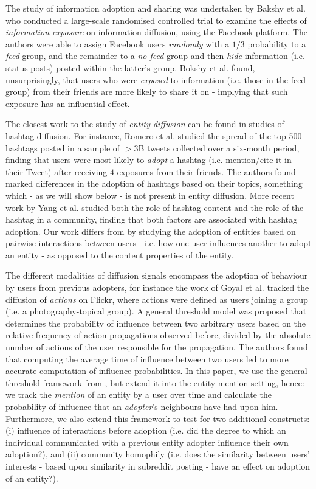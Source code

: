 \documentclass[review]{elsarticle}
\begin{document}
The study of information adoption and sharing was undertaken by Bakshy et al. \cite{bakshy2012role} who conducted a large-scale randomised controlled trial to examine the effects of \emph{information exposure} on information diffusion, using the Facebook platform.
The authors were able to assign Facebook users \emph{randomly} with a $1/3$ probability to a \emph{feed} group, and the remainder to a \emph{no feed} group and then \emph{hide} information (i.e. status posts) posted within the latter's group.
Bokshy et al. found, unsurprisingly, that users who were \emph{exposed} to information (i.e. those in the feed group) from their friends are more likely to share it on - implying that such exposure has an influential effect.

The closest work to the study of \emph{entity diffusion} can be found in studies of hashtag diffusion.
For instance, Romero et al. \cite{romero2011differences} studied the spread of the top-500 hashtags posted in a sample of $>3$B tweets collected over a six-month period, finding that users were most likely to \emph{adopt} a hashtag (i.e. mention/cite it in their Tweet) after receiving $4$ exposures from their friends.
The authors found marked differences in the adoption of hashtags based on their topics, something which - as we will show below - is not present in entity diffusion.
More recent work by Yang et al. \cite{yang2012we} studied both the role of hashtag content and the role of the hashtag in a community, finding that both factors are associated with hashtag adoption.
Our work differs from \cite{yang2012we} by studying the adoption of entities based on pairwise interactions between users - i.e. how one user influences another to adopt an entity - as opposed to the content properties of the entity.

The different modalities of diffusion signals encompass the adoption of behaviour by users from previous adopters, for instance the work of Goyal et al. \cite{goyal2010learning} tracked the diffusion of \emph{actions} on Flickr, where actions were defined as users joining a group (i.e. a photography-topical group).
A general threshold model was proposed that determines the probability of influence between two arbitrary users based on the relative frequency of action propagations observed before, divided by the absolute number of actions of the user responsible for the propagation.
The authors found that computing the average time of influence between two users led to more accurate computation of influence probabilities.
In this paper, we use the general threshold framework from \cite{goyal2010learning}, but extend it into the entity-mention setting, hence: we track the \emph{mention} of an entity by a user over time and calculate the probability of influence that an \emph{adopter}'s neighbours have had upon him.
Furthermore, we also extend this framework to test for two additional constructs: (i) influence of interactions before adoption (i.e. did the degree to which an individual communicated with a previous entity adopter influence their own adoption?), and (ii) community homophily (i.e. does the similarity between users' interests - based upon similarity in subreddit posting - have an effect on adoption of an entity?).
\end{document}
